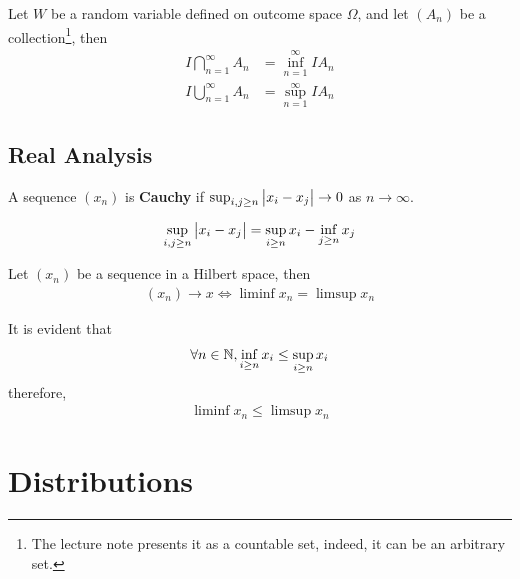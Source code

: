 \documentclass{article}
\begin{document}
	\begin{proposition}
		Let $W$ be a random variable defined on outcome space $\Omega$, and let $(A_n)$ be a collection\footnote{The lecture note presents it as a countable set, indeed, it can be an arbitrary set.}, then
		\begin{align}
			I\bigcap_{n=1}^\infty A_n &= \inf_{n=1}^\infty I A_n \\
			I\bigcup_{n=1}^\infty A_n &= \sup_{n=1}^\infty I A_n
		\end{align}
	\end{proposition}

	\subsection{Real Analysis}
	\begin{definition}
		A sequence $(x_n)$ is \textbf{Cauchy} if $\sup_{i, j \geq n} \big \vert {x_i - x_j} \big \vert \to 0$ as $n \to \infty$.
	\end{definition}
	
	\begin{proposition}
		\begin{align}
			\sup_{i, j \geq n} \big \vert {x_i - x_j} \big \vert = \sup_{i \geq n} x_i - \inf_{j \geq n} x_j
		\end{align}
	\end{proposition}

	\begin{theorem}
		Let $(x_n)$ be a sequence in a Hilbert space, then 
		\begin{align}
			(x_n) \to x \iff \liminf x_n = \limsup x_n
		\end{align}
	\end{theorem}
	
	\begin{proposition}
	It is evident that
	\begin{align}
		\forall n \in \mathbb{N}, \inf_{i\geq n} x_i \leq \sup_{i \geq n} x_i	
	\end{align}
	therefore, 
	\begin{align}
		\liminf x_n \leq \limsup x_n
	\end{align}
	\end{proposition}









   	\section{Distributions}
	
\end{document}
